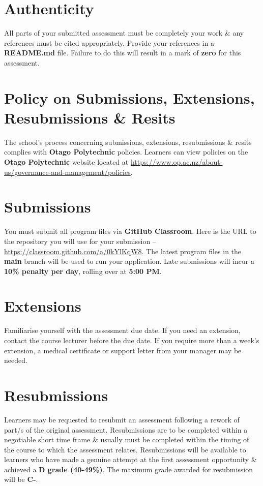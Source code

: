 \documentclass{article}
\begin{document}
\section*{Authenticity}
All parts of your submitted assessment must be completely your work \& any references must be cited appropriately. Provide your references in a \textbf{README.md} file. Failure to do this will result in a mark of \textbf{zero} for this assessment.

\section*{Policy on Submissions, Extensions, Resubmissions \& Resits}
The school's process concerning submissions, extensions, resubmissions \& resits complies with \textbf{Otago Polytechnic} policies. Learners can view policies on the \textbf{Otago Polytechnic} website located at \href{https://www.op.ac.nz/about-us/governance-and-management/policies}{https://www.op.ac.nz/about-us/governance-and-management/policies}.

\section*{Submissions}
You must submit all program files via \textbf{GitHub Classroom}. Here is the URL to the repository you will use for your submission – \href{https://classroom.github.com/a/0kYlKqW8}{https://classroom.github.com/a/0kYlKqW8}. The latest program files in the \textbf{main} branch will be used to run your application. Late submissions will incur a \textbf{10\% penalty per day}, rolling over at \textbf{5:00 PM}.

\section*{Extensions}
Familiarise yourself with the assessment due date. If you need an extension, contact the course lecturer before the due date. If you require more than a week's extension, a medical certificate or support letter from your manager may be needed.

\section*{Resubmissions}
Learners may be requested to resubmit an assessment following a rework of part/s of the original assessment. Resubmissions are to be completed within a negotiable short time frame \& usually must be completed within the timing of the course to which the assessment relates. Resubmissions will be available to learners who have made a genuine attempt at the first assessment opportunity \& achieved a \textbf{D grade (40-49\%)}. The maximum grade awarded for resubmission will be \textbf{C-}.
\end{document}
